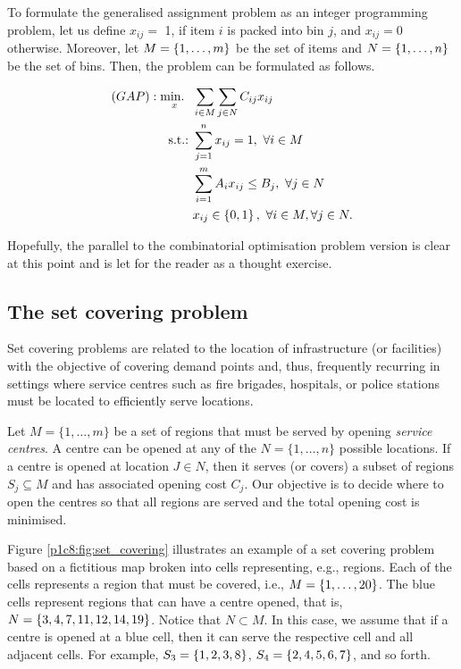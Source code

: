 To formulate the generalised assignment problem as an integer programming problem, let us define $x_{ij} =$ 1, if item $i$ is packed into bin $j$, and $x_{ij} = 0$ otherwise. Moreover, let $M = \left\{ 1,\dots,m \right \}$ be the set of items and $N = \left\{ 1,\dots,n \right \}$ be the set of bins. Then, the problem can be formulated as follows.

\begin{align*}
	(GAP) : \mathop{\text{min.~}}_x \ & \sum_{i \in M}\sum_{j \in N} C_{ij}x_{ij} \\
	\mathop{\text{s.t.:~}} & \sum_{j=1}^n x_{ij} = 1, \ \forall i \in M\\
	  & \sum_{i=1}^m A_{i}x_{ij} \leq B_j, \ \forall j \in N\\
	  & x_{ij} \in \left\{ 0,1 \right \}, \ \forall i \in M, \forall j \in N. 
\end{align*} 

Hopefully, the parallel to the combinatorial optimisation problem version is clear at this point and is let for the reader as a thought exercise. 


\subsection{The set covering problem}

Set covering problems are related to the location of infrastructure (or facilities) with the objective of covering demand points and, thus, frequently recurring in settings where service centres such as fire brigades, hospitals, or police stations must be located to efficiently serve locations.

Let $M = \{1,\dots,m\}$ be a set of regions that must be served by opening \emph{service centres}. A centre can be opened at any of the $N = \{1,\dots,n\}$ possible locations. If a centre is opened at location $J \in N$, then it serves (or covers) a subset of regions $S_j \subseteq M$ and has associated opening cost $C_j$. Our objective is to decide where to open the centres so that all regions are served and the total opening cost is minimised. 

Figure \ref{p1c8:fig:set_covering} illustrates an example of a set covering problem based on a fictitious map broken into cells representing, e.g., regions. Each of the cells represents a region that must be covered, i.e., $M = \left\{ 1,\dots, 20 \right \}$. The blue cells represent regions that can have a centre opened, that is, $N = \left\{ 3,4,7,11,12,14,19 \right \}$. Notice that $N \subset M$. In this case, we assume that if a centre is opened at a blue cell, then it can serve the respective cell and all adjacent cells. For example, $S_3 = \left\{ 1,2,3,8 \right \}$, $S_4=\left\{ 2,4,5,6,7 \right \}$, and so forth.

